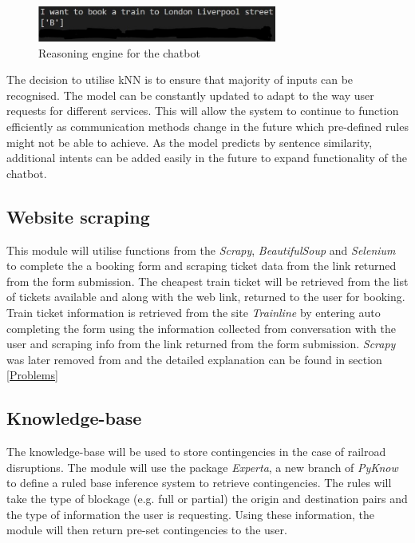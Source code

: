 \documentclass[11pt]{article}
\begin{document}
\begin{figure}[!htb]
	\centering
	\includegraphics[width=0.7\textwidth]{Reasoning_Prototype}
	\caption{Reasoning engine for the chatbot }\label{fig:Reasoning_Prototype}
\end{figure}

The decision to utilise kNN is to ensure that majority of inputs can be recognised. The model can be constantly updated to adapt to the way user requests for different services. This will allow the system to continue to function efficiently as communication methods change in the future which pre-defined rules might not be able to achieve. As the model predicts by sentence similarity, additional intents can be added easily in the future to expand functionality of the chatbot.

\subsection{Website scraping}
This module will utilise functions from the \textit{Scrapy}, \textit{BeautifulSoup} and \textit{Selenium} to complete the a booking form and scraping ticket data from the link returned from the form submission. The cheapest train ticket will be retrieved from the list of tickets available and along with the web link, returned to the user for booking. Train ticket information is retrieved from the site \textit{Trainline} by entering auto completing the form using the information collected from conversation with the user and scraping info from the link returned from the form submission. \textit{Scrapy} was later removed from and the detailed explanation can be found in section \ref{Problems}

\subsection{Knowledge-base}
The knowledge-base will be used to store contingencies in the case of railroad disruptions. The module will use the package \textit{Experta}, a new branch of \textit{PyKnow} to define a ruled base inference system to retrieve contingencies. The rules will take the type of blockage (e.g. full or partial) the origin and destination pairs and the type of information the user is requesting. Using these information, the module will then return pre-set contingencies to the user.
\end{document}
